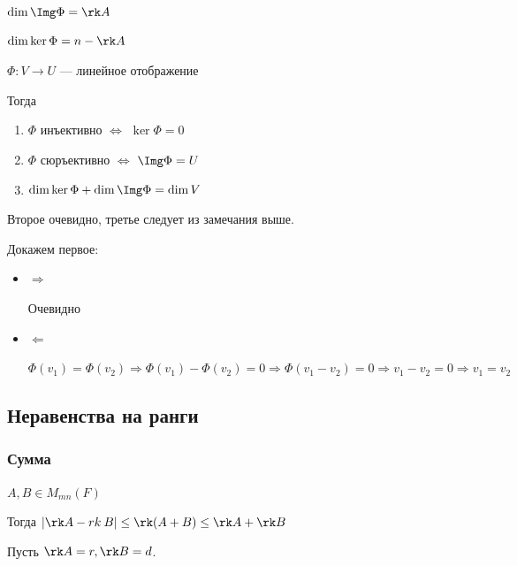 \begin{remark}{}{}
    \( \dim \Img \Phi = \rk A \)

    \( \dim \ker \Phi = n - \rk A \)
\end{remark}

\begin{lemma}{}{}
    \( \Phi : V \to U \) --- линейное отображение

    Тогда
    \begin{enumerate}
        \item
            \( \Phi \) инъективно \( \Leftrightarrow \) \( \ker \Phi = 0 \)
        \item
            \( \Phi \) сюръективно \( \Leftrightarrow \) \( \Img \Phi = U \)
        \item
            \( \dim \ker \Phi + \dim \Img \Phi = \dim V \ \)
    \end{enumerate}
\end{lemma}

Второе очевидно, третье следует из замечания выше.

Докажем первое:
\begin{itemize}
    \item
        \( \Rightarrow \)

        Очевидно
    \item
        \( \Leftarrow \)

        \(
            \Phi(v_1) = \Phi(v_2)
            \Rightarrow
            \Phi(v_1) - \Phi(v_2) = 0
            \Rightarrow
            \Phi(v_1 - v_2) = 0
            \Rightarrow
            v_1 - v_2 = 0
            \Rightarrow
            v_1 = v_2
        \)
\end{itemize}

\newpage

\subsection{Неравенства на ранги}

\subsubsection{Сумма}

\begin{lemma}{}{}
    \( A, B \in M_{mn} (F) \)

    Тогда \( | \rk A - rk \: B | \leq \rk (A + B) \leq \rk A + \rk B \)
\end{lemma}

Пусть \( \rk A = r, \rk B = d \).

